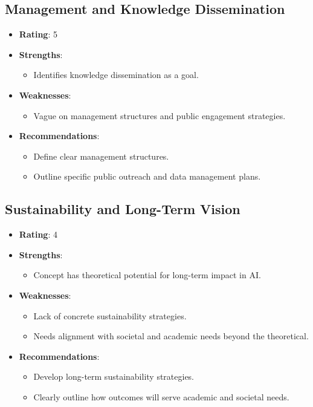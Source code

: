 \documentclass{article}
\begin{document}
\subsection{Management and Knowledge Dissemination}
\begin{itemize}
    \item \textbf{Rating}: 5
    \item \textbf{Strengths}: 
    \begin{itemize}
        \item Identifies knowledge dissemination as a goal.
    \end{itemize}
    \item \textbf{Weaknesses}: 
    \begin{itemize}
        \item Vague on management structures and public engagement strategies.
    \end{itemize}
    \item \textbf{Recommendations}: 
    \begin{itemize}
        \item Define clear management structures.
        \item Outline specific public outreach and data management plans.
    \end{itemize}
\end{itemize}

\subsection{Sustainability and Long-Term Vision}
\begin{itemize}
    \item \textbf{Rating}: 4
    \item \textbf{Strengths}: 
    \begin{itemize}
        \item Concept has theoretical potential for long-term impact in AI.
    \end{itemize}
    \item \textbf{Weaknesses}: 
    \begin{itemize}
        \item Lack of concrete sustainability strategies.
        \item Needs alignment with societal and academic needs beyond the theoretical.
    \end{itemize}
    \item \textbf{Recommendations}: 
    \begin{itemize}
        \item Develop long-term sustainability strategies.
        \item Clearly outline how outcomes will serve academic and societal needs.
    \end{itemize}
\end{itemize}
\end{document}
